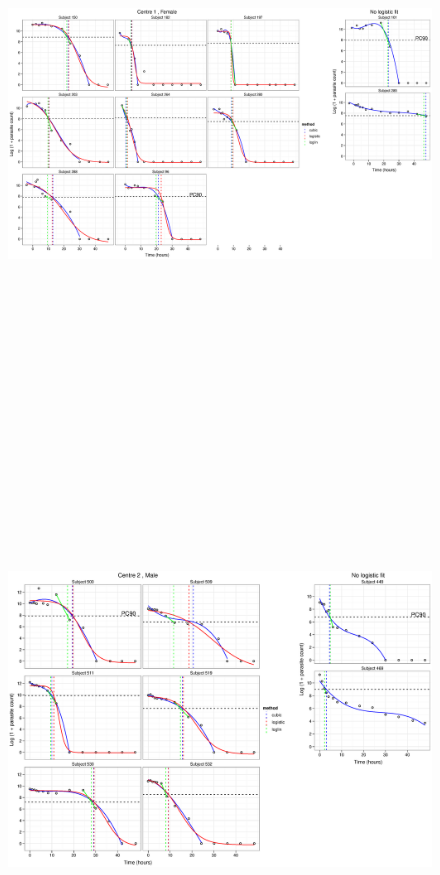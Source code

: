 \begin{singlespace}
\begin{figure}
\includegraphics[height=150mm]{Afits1F.eps}
\end{figure}
\begin{figure}
\centering
\includegraphics[height=150mm]{Afits2M.eps}

\end{figure}
\end{singlespace}
